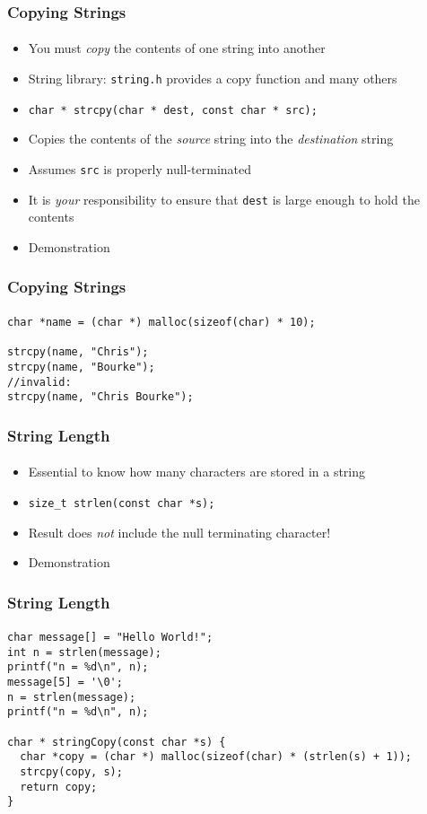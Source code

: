 \documentclass[]{beamer}
\begin{document}
\begin{frame}[fragile]
    \frametitle{Copying Strings}
    \framesubtitle{}

\begin{itemize}[<+->]
  \item You must \emph{copy} the contents of one string into another
  \item String library: \texttt{string.h} provides a 
  copy function and many others
  \item \texttt{char * strcpy(char * dest, const char * src);}
  \item Copies the contents of the \emph{source} string into the \emph{destination} string
  \item Assumes \texttt{src} is properly null-terminated
  \item It is \emph{your} responsibility to ensure that \texttt{dest}
  is large enough to hold the contents
  \item Demonstration
\end{itemize}
  
\end{frame}

\begin{frame}[fragile]
    \frametitle{Copying Strings}
    \framesubtitle{}

\begin{verbatim}
char *name = (char *) malloc(sizeof(char) * 10);

strcpy(name, "Chris");
strcpy(name, "Bourke");
//invalid:
strcpy(name, "Chris Bourke");
\end{verbatim}
  
\end{frame}

\begin{frame}[fragile]
    \frametitle{String Length}
    \framesubtitle{}

\begin{itemize}[<+->]
  \item Essential to know how many characters are stored in a string
  \item \texttt{size_t strlen(const char *s);}
  \item Result does \emph{not} include the null terminating character!
  \item Demonstration
\end{itemize}
  
\end{frame}

\begin{frame}[fragile]
    \frametitle{String Length}
    \framesubtitle{}

\begin{verbatim}
char message[] = "Hello World!";
int n = strlen(message);
printf("n = %d\n", n);
message[5] = '\0';
n = strlen(message);
printf("n = %d\n", n);

char * stringCopy(const char *s) {
  char *copy = (char *) malloc(sizeof(char) * (strlen(s) + 1));
  strcpy(copy, s);
  return copy;
}
\end{verbatim}

\end{frame}
\end{document}
